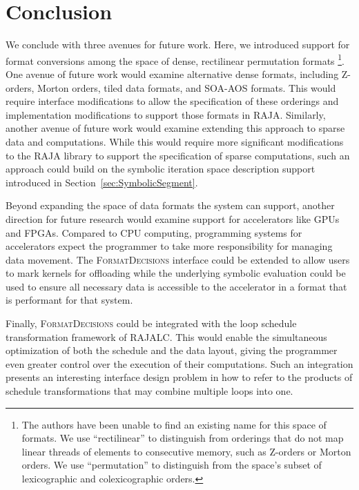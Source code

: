 \documentclass{report}
\newcounter{col}
\newcommand{\FormatDecisions}[0]{{\textsc{FormatDecisions}}}
\begin{document}

%

%



\chapter{Conclusion}

We conclude with three avenues for future work.
Here, we introduced support for format conversions among the space of dense, rectilinear permutation formats
\footnote{The authors have been unable to find an existing name for this space of formats. We use \enquote{rectilinear} to distinguish from orderings that do not map linear threads of elements to consecutive memory, such as Z-orders or Morton orders. We use \enquote{permutation} to distinguish from the space's subset of lexicographic and colexicographic orders.}. 
One avenue of future work would examine alternative dense formats, including Z-orders, Morton orders, tiled data formats, and SOA-AOS formats.
This would require interface modifications to allow the specification of these orderings and implementation modifications to support those formats in RAJA.
Similarly, another avenue of future work would examine extending this approach to sparse data and computations. 
While this would require more significant modifications to the RAJA library to support the specification of sparse computations, such an approach could build on the symbolic iteration space description support introduced in Section~\ref{sec:SymbolicSegment}. 

Beyond expanding the space of data formats the system can support, another direction for future research would examine support for accelerators like GPUs and FPGAs.
Compared to CPU computing, programming systems for accelerators expect the programmer to take more responsibility for managing data movement.
The \FormatDecisions{} interface could be extended to allow users to mark kernels for offloading while the underlying symbolic evaluation could be used to ensure all necessary data is accessible to the accelerator in a format that is performant for that system. 

Finally, \FormatDecisions{} could be integrated with the loop schedule transformation framework of RAJALC. 
This would enable the simultaneous optimization of both the schedule and the data layout, giving the programmer even greater control over the execution of their computations.
Such an integration presents an interesting interface design problem in how to refer to the products of schedule transformations that may combine multiple loops into one. 




\end{document}

